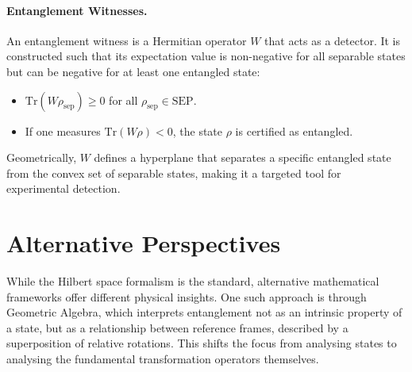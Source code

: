 \paragraph{Entanglement Witnesses.}
An entanglement witness is a Hermitian operator $W$ that acts as a
detector. It is constructed such that its expectation value is non-negative
for all separable states but can be negative for at least one entangled state:
\begin{itemize}
	\item $\mathrm{Tr}(W \rho_{\text{sep}}) \ge 0$ for all $\rho_{\text{sep}} \in \text{SEP}$.
	\item If one measures $\mathrm{Tr}(W \rho) < 0$, the state $\rho$ is certified as entangled.
\end{itemize}
Geometrically, $W$ defines a hyperplane that separates a specific entangled
state from the convex set of separable states, making it a targeted tool for
experimental detection.

\section{Alternative Perspectives}
\label{sec:alternative_perspectives}

While the Hilbert space formalism is the standard, alternative mathematical
frameworks offer different physical insights. One such approach is through
Geometric Algebra, which interprets entanglement not as an intrinsic
property of a state, but as a relationship between reference frames, described
by a superposition of relative rotations. This shifts the focus from analysing
states to analysing the fundamental transformation operators themselves.
